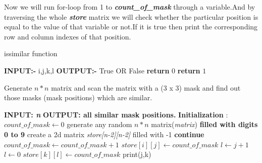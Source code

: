 \documentclass[conference]{IEEEtran}
\begin{document}
Now we will run for-loop from 1 to \textbf{\textit{count\_of\_mask}} through a variable.And by traversing the whole \textbf{\textit{store}} matrix we will check whether the particular position is equal to the value of that variable or not.If it is true then print the corresponding row and column indexes of that position.\\%


\begin{algorithm}[H]
\caption{issimilar function}
\end{algorithm}
\begin{algorithmic}[1]
\STATE \textbf{INPUT:-} i,j,k,l
\STATE \textbf{OUTPUT:-} True OR False
        	\STATE \textbf{return} $0$
         \ENDIF
      \ENDFOR
 \ENDFOR
 \STATE \textbf{return} $1$
\end{algorithmic}



\begin{algorithm}[H]
\caption{Generate $n*n$ matrix and scan the matrix with a (3 x 3) mask and find out those masks (mask positions) which are similar.}
\end{algorithm}
\begin{algorithmic}[1]
\STATE \textbf{INPUT: \textit{n}}
\STATE \textbf{OUTPUT: all similar mask positions.}
\STATE \textbf{Initialization} : $\textit{count\_of\_mask} \gets 0$
\STATE generate any random $ n*n $ matrix(\textit{matrix}) \textbf{filled with digits  0 to 9}
\STATE create a 2d matrix \textit{store[n-2][n-2]} filled with -1 
        	 \STATE \textbf{continue}
        \ELSE
        	\STATE $count\_of\_mask \gets count\_of\_mask+1 $
        \ENDIF
       	\STATE $store[i][j] \gets count\_of\_mask$
            	\STATE $l \gets j+1$
            \ELSE 
            	\STATE $l \gets 0$
            \ENDIF
                	\STATE \textit{$store[k][l] \gets count\_of\_mask$}
                \ENDIF
            \ENDFOR
        \ENDFOR
    \ENDFOR
\ENDFOR
{}
            	\STATE print(j,k)
            \ENDIF
        \ENDFOR
   \ENDFOR
\ENDFOR
\end{algorithmic}
\end{document}
